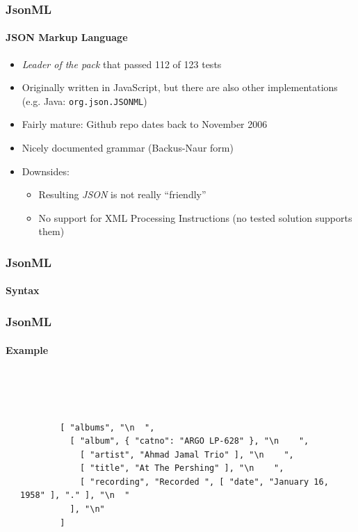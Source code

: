 \documentclass[
    alternativetitlepage=alternativ,
    cornerlogo=hgi_nds_logo2,
    sectionoverview,
]{rubpresentation}
\begin{document}
\begin{frame}[fragile]
  \frametitle{JsonML}
  \framesubtitle{JSON Markup Language}
  \begin{itemize}
    \item{} \emph{Leader of the pack} that passed 112 of 123 tests
    \item{} Originally written in JavaScript, but there are also other implementations (e.g. Java: \texttt{org.json.JSONML})
    \item{} Fairly mature: Github repo dates back to November 2006
    \item{} Nicely documented grammar (Backus-Naur form)
    \item{} Downsides:
      \begin{itemize}
        \item{} Resulting \emph{JSON} is not really \enquote{friendly}
        \item{} No support for XML Processing Instructions (no tested solution supports them)
      \end{itemize}
  \end{itemize}
\end{frame}

\begin{frame}[fragile]
  \frametitle{JsonML}
  \framesubtitle{Syntax}
  \begin{center}
    
  \end{center}
\end{frame}

\begin{frame}[fragile]
  \frametitle{JsonML}
  \framesubtitle{Example}
  \begin{columns}[t]
    \begin{column}{0.45\textwidth}
      \inputminted[breaklines,autogobble,fontsize=\tiny]{xml}{thesis/xmltree.xml}
    \end{column}
    \begin{column}{0.55\textwidth}
      \begin{verbatim}



        [ "albums", "\n  ",
          [ "album", { "catno": "ARGO LP-628" }, "\n    ",
            [ "artist", "Ahmad Jamal Trio" ], "\n    ",
            [ "title", "At The Pershing" ], "\n    ",
            [ "recording", "Recorded ", [ "date", "January 16, 1958" ], "." ], "\n  "
          ], "\n"
        ]
      \end{verbatim}
    \end{column}
  \end{columns}
\end{frame}
\end{document}
